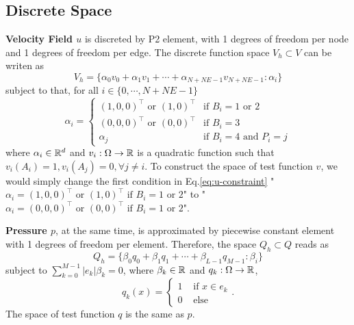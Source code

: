 \subsection{Discrete Space}
\textbf{Velocity Field $u$} is discreted by P2 element, 
with 1 degrees of freedom per node and 1 degrees of freedom per edge.
The discrete function space $V_h\subset V$ can be writen as
\begin{equation}\label{eq:u-space}
  V_h=\{\alpha_0v_0+\alpha_1v_1+\cdots+\alpha_{N+NE-1}v_{N+NE-1}:\alpha_i\}
\end{equation}
subject to that, for all $i\in\{0,\cdots,N+NE-1\}$
\begin{equation}\label{eq:u-constraint}
  \alpha_i=\left\{
  \begin{array}{ll}
    (1,0,0)^\top \text{ or } (1,0)^\top & \text{if } B_i=1\text{ or }2 \\
    (0,0,0)^\top \text{ or } (0,0)^\top & \text{if } B_i=3 \\
    \alpha_j & \text{if } B_i=4 \text{ and } P_i=j
  \end{array}
  \right.
\end{equation}
where $\alpha_i\in\mathbb{R}^d$ and $v_i:\Omega\to\mathbb{R}$ is a 
quadratic function such that $v_i(A_i)=1,v_i(A_j)=0,\forall j\neq i$.
To construct the space of test function $v$, we would simply change the first condition in 
Eq.\eqref{eq:u-constraint} "$\alpha_i=(1,0,0)^\top \text{ or } (1,0)^\top \text{ if } B_i=1\text{ or }2$" to 
"$\alpha_i=(0,0,0)^\top \text{ or } (0,0)^\top \text{ if } B_i=1\text{ or }2$".

\textbf{Pressure $p$}, at the same time, is approximated by piecewise constant element 
with 1 degrees of freedom per element. Therefore, the space $Q_h\subset Q$ reads as
\begin{equation}\label{eq:p-space}
  Q_h=\{\beta_0q_0+\beta_1q_1+\cdots+\beta_{L-1}q_{M-1}:\beta_i\}
\end{equation}
subject to $\sum_{k=0}^{M-1}|e_k|\beta_k=0$, where $\beta_k\in\mathbb{R}$ and $q_k:\Omega\to\mathbb{R}$,
\[
  q_k(x)=\left\{
    \begin{array}{ll}
      1 & \text{ if } x\in e_k \\
      0 & \text{ else}
    \end{array}
    \right..
  \]
The space of test function $q$ is the same as $p$.

